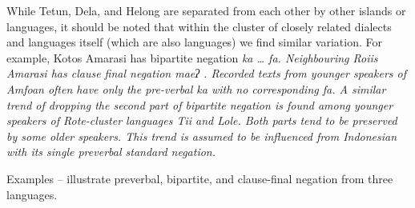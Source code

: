 \newpage
\begin{exe}
	\vspace{-1mm}
\end{exe}

While Tetun, Dela, and Helong are separated from each other by
other islands or languages,
it should be noted that within the  cluster of closely
related dialects and languages itself (which are also  languages)
we find similar variation.
For example, Kotos Amarasi has bipartite negation \it{ka {\ldots} fa}.
Neighbouring Roi{\Q}is Amarasi has clause final negation \it{maeʔ} \citep[412]{Edwards2020}.
Recorded texts from younger speakers of Amfo{\Q}an often have only
the pre-verbal \it{ka} with no corresponding \it{fa}.
A similar trend of dropping the second part of bipartite negation
is found among younger speakers of Rote-cluster languages Tii and Lole.
Both parts tend to be preserved by some older speakers.
This trend is assumed to be influenced from Indonesian with its
single preverbal standard negation.

Examples -- illustrate preverbal,
bipartite, and clause-final negation from three  languages.

\begin{exe}
	\vspace{-1mm}
	\vspace{-1mm}
	\vspace{-1mm}
\end{exe}

